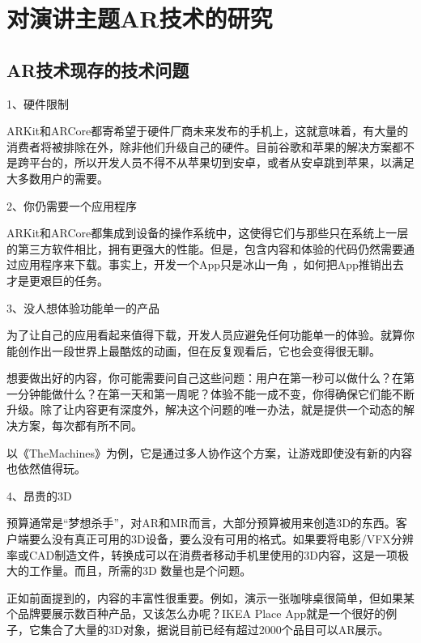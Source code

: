 \documentclass{article}
\begin{document}
\section{对演讲主题AR技术的研究}

\subsection{AR技术现存的技术问题}
1、硬件限制\par

ARKit和ARCore都寄希望于硬件厂商未来发布的手机上，这就意味着，有大量的消费者将被排除在外，除非他们升级自己的硬件。目前谷歌和苹果的解决方案都不是跨平台的，所以开发人员不得不从苹果切到安卓，或者从安卓跳到苹果，以满足大多数用户的需要。\par

2、你仍需要一个应用程序\par

ARKit和ARCore都集成到设备的操作系统中，这使得它们与那些只在系统上一层的第三方软件相比，拥有更强大的性能。但是，包含内容和体验的代码仍然需要通过应用程序来下载。事实上，开发一个App只是冰山一角 ，如何把App推销出去才是更艰巨的任务。\par
3、没人想体验功能单一的产品\par

为了让自己的应用看起来值得下载，开发人员应避免任何功能单一的体验。就算你能创作出一段世界上最酷炫的动画，但在反复观看后，它也会变得很无聊。\par

想要做出好的内容，你可能需要问自己这些问题：用户在第一秒可以做什么？在第一分钟能做什么？在第一天和第一周呢？体验不能一成不变，你得确保它们能不断升级。除了让内容更有深度外，解决这个问题的唯一办法，就是提供一个动态的解决方案，每次都有所不同。\par

以《TheMachines》为例，它是通过多人协作这个方案，让游戏即使没有新的内容也依然值得玩。\par

4、昂贵的3D\par

预算通常是“梦想杀手”，对AR和MR而言，大部分预算被用来创造3D的东西。客户端要么没有真正可用的3D设备，要么没有可用的格式。如果要将电影/VFX分辨率或CAD制造文件，转换成可以在消费者移动手机里使用的3D内容，这是一项极大的工作量。而且，所需的3D 数量也是个问题。\par

正如前面提到的，内容的丰富性很重要。例如，演示一张咖啡桌很简单，但如果某个品牌要展示数百种产品，又该怎么办呢？IKEA Place App就是一个很好的例子，它集合了大量的3D对象，据说目前已经有超过2000个品目可以AR展示。\par
\end{document}
